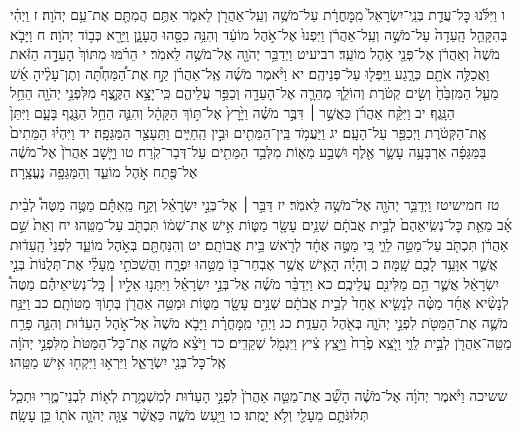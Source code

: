 \documentclass[twoside, openany, parskip=half, 11pt]{book}
\begin{document}
ו וַיִּלֹּ֜נוּ כׇּל־עֲדַ֤ת בְּנֵֽי־יִשְׂרָאֵל֙ מִֽמׇּחֳרָ֔ת עַל־מֹשֶׁ֥ה וְעַֽל־אַהֲרֹ֖ן לֵאמֹ֑ר אַתֶּ֥ם הֲמִתֶּ֖ם אֶת־עַ֥ם יְהֹוָה׃ ז וַיְהִ֗י בְּהִקָּהֵ֤ל הָֽעֵדָה֙ עַל־מֹשֶׁ֣ה וְעַֽל־אַהֲרֹ֔ן וַיִּפְנוּ֙ אֶל־אֹ֣הֶל מוֹעֵ֔ד וְהִנֵּ֥ה כִסָּ֖הוּ הֶעָנָ֑ן וַיֵּרָ֖א כְּב֥וֹד יְהֹוָה׃ ח וַיָּבֹ֤א מֹשֶׁה֙ וְאַהֲרֹ֔ן אֶל־פְּנֵ֖י אֹ֥הֶל מוֹעֵֽד׃
רביעיט וַיְדַבֵּ֥ר יְהֹוָ֖ה אֶל־מֹשֶׁ֥ה לֵּאמֹֽר׃ י הֵרֹ֗מּוּ מִתּוֹךְ֙ הָעֵדָ֣ה הַזֹּ֔את וַאֲכַלֶּ֥ה אֹתָ֖ם כְּרָ֑גַע וַֽיִּפְּל֖וּ עַל־פְּנֵיהֶֽם׃ יא וַיֹּ֨אמֶר מֹשֶׁ֜ה אֶֽל־אַהֲרֹ֗ן קַ֣ח אֶת־הַ֠מַּחְתָּ֠ה וְתֶן־עָלֶ֨יהָ אֵ֜שׁ מֵעַ֤ל הַמִּזְבֵּ֙חַ֙ וְשִׂ֣ים קְטֹ֔רֶת וְהוֹלֵ֧ךְ מְהֵרָ֛ה אֶל־הָעֵדָ֖ה וְכַפֵּ֣ר עֲלֵיהֶ֑ם כִּֽי־יָצָ֥א הַקֶּ֛צֶף מִלִּפְנֵ֥י יְהֹוָ֖ה הֵחֵ֥ל הַנָּֽגֶף׃ יב וַיִּקַּ֨ח אַהֲרֹ֜ן כַּאֲשֶׁ֣ר ׀ דִּבֶּ֣ר מֹשֶׁ֗ה וַיָּ֙רׇץ֙ אֶל־תּ֣וֹךְ הַקָּהָ֔ל וְהִנֵּ֛ה הֵחֵ֥ל הַנֶּ֖גֶף בָּעָ֑ם וַיִּתֵּן֙ אֶֽת־הַקְּטֹ֔רֶת וַיְכַפֵּ֖ר עַל־הָעָֽם׃ יג וַיַּעֲמֹ֥ד בֵּֽין־הַמֵּתִ֖ים וּבֵ֣ין הַֽחַיִּ֑ים וַתֵּעָצַ֖ר הַמַּגֵּפָֽה׃ יד וַיִּהְי֗וּ הַמֵּתִים֙ בַּמַּגֵּפָ֔ה אַרְבָּעָ֥ה עָשָׂ֛ר אֶ֖לֶף וּשְׁבַ֣ע מֵא֑וֹת מִלְּבַ֥ד הַמֵּתִ֖ים עַל־דְּבַר־קֹֽרַח׃ טו וַיָּ֤שׇׁב אַהֲרֹן֙ אֶל־מֹשֶׁ֔ה אֶל־פֶּ֖תַח אֹ֣הֶל מוֹעֵ֑ד וְהַמַּגֵּפָ֖ה נֶעֱצָֽרָה׃

טז חמישיטז וַיְדַבֵּ֥ר יְהֹוָ֖ה אֶל־מֹשֶׁ֥ה לֵּאמֹֽר׃ יז דַּבֵּ֣ר ׀ אֶל־בְּנֵ֣י יִשְׂרָאֵ֗ל וְקַ֣ח מֵֽאִתָּ֡ם מַטֶּ֣ה מַטֶּה֩ לְבֵ֨ית אָ֜ב מֵאֵ֤ת כׇּל־נְשִֽׂיאֵהֶם֙ לְבֵ֣ית אֲבֹתָ֔ם שְׁנֵ֥ים עָשָׂ֖ר מַטּ֑וֹת אִ֣ישׁ אֶת־שְׁמ֔וֹ תִּכְתֹּ֖ב עַל־מַטֵּֽהוּ׃ יח וְאֵת֙ שֵׁ֣ם אַהֲרֹ֔ן תִּכְתֹּ֖ב עַל־מַטֵּ֣ה לֵוִ֑י כִּ֚י מַטֶּ֣ה אֶחָ֔ד לְרֹ֖אשׁ בֵּ֥ית אֲבוֹתָֽם׃ יט וְהִנַּחְתָּ֖ם בְּאֹ֣הֶל מוֹעֵ֑ד לִפְנֵי֙ הָֽעֵד֔וּת אֲשֶׁ֛ר אִוָּעֵ֥ד לָכֶ֖ם שָֽׁמָּה׃ כ וְהָיָ֗ה הָאִ֛ישׁ אֲשֶׁ֥ר אֶבְחַר־בּ֖וֹ מַטֵּ֣הוּ יִפְרָ֑ח וַהֲשִׁכֹּתִ֣י מֵֽעָלַ֗י אֶת־תְּלֻנּוֹת֙ בְּנֵ֣י יִשְׂרָאֵ֔ל אֲשֶׁ֛ר הֵ֥ם מַלִּינִ֖ם עֲלֵיכֶֽם׃ כא וַיְדַבֵּ֨ר מֹשֶׁ֜ה אֶל־בְּנֵ֣י יִשְׂרָאֵ֗ל וַיִּתְּנ֣וּ אֵלָ֣יו ׀ כָּֽל־נְשִׂיאֵיהֶ֡ם מַטֶּה֩ לְנָשִׂ֨יא אֶחָ֜ד מַטֶּ֨ה לְנָשִׂ֤יא אֶחָד֙ לְבֵ֣ית אֲבֹתָ֔ם שְׁנֵ֥ים עָשָׂ֖ר מַטּ֑וֹת וּמַטֵּ֥ה אַהֲרֹ֖ן בְּת֥וֹךְ מַטּוֹתָֽם׃ כב וַיַּנַּ֥ח מֹשֶׁ֛ה אֶת־הַמַּטֹּ֖ת לִפְנֵ֣י יְהֹוָ֑ה בְּאֹ֖הֶל הָעֵדֻֽת׃ כג וַיְהִ֣י מִֽמׇּחֳרָ֗ת וַיָּבֹ֤א מֹשֶׁה֙ אֶל־אֹ֣הֶל הָעֵד֔וּת וְהִנֵּ֛ה פָּרַ֥ח מַטֵּֽה־אַהֲרֹ֖ן לְבֵ֣ית לֵוִ֑י וַיֹּ֤צֵֽא פֶ֙רַח֙ וַיָּ֣צֵֽץ צִ֔יץ וַיִּגְמֹ֖ל שְׁקֵדִֽים׃ כד וַיֹּצֵ֨א מֹשֶׁ֤ה אֶת־כׇּל־הַמַּטֹּת֙ מִלִּפְנֵ֣י יְהֹוָ֔ה אֶֽל־כׇּל־בְּנֵ֖י יִשְׂרָאֵ֑ל וַיִּרְא֥וּ וַיִּקְח֖וּ אִ֥ישׁ מַטֵּֽהוּ׃

ששיכה וַיֹּ֨אמֶר יְהֹוָ֜ה אֶל־מֹשֶׁ֗ה הָשֵׁ֞ב אֶת־מַטֵּ֤ה אַהֲרֹן֙ לִפְנֵ֣י הָעֵד֔וּת לְמִשְׁמֶ֥רֶת לְא֖וֹת לִבְנֵי־מֶ֑רִי וּתְכַ֧ל תְּלוּנֹּתָ֛ם מֵעָלַ֖י וְלֹ֥א יָמֻֽתוּ׃ כו וַיַּ֖עַשׂ מֹשֶׁ֑ה כַּאֲשֶׁ֨ר צִוָּ֧ה יְהֹוָ֛ה אֹת֖וֹ כֵּ֥ן עָשָֽׂה׃
\end{document}
